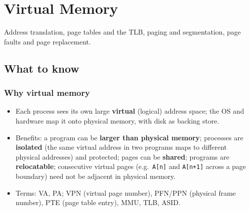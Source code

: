 \section{Virtual Memory}
\label{sec:vm}

Address translation, page tables and the TLB, paging and segmentation, page faults
and page replacement.

\subsection{What to know}

\subsubsection{Why virtual memory}
\begin{itemize}[leftmargin=*]
  \item Each process sees its own large \textbf{virtual} (logical) address space; the
  OS and hardware map it onto physical memory, with disk as backing store.
  \item Benefits: a program can be \textbf{larger than physical memory}; processes
  are \textbf{isolated} (the same virtual address in two programs maps to different
  physical addresses) and protected; pages can be \textbf{shared}; programs are
  \textbf{relocatable}; consecutive virtual pages (e.g.\ \texttt{A[n]} and
  \texttt{A[n+1]} across a page boundary) need not be adjacent in physical memory.
  \item Terms: VA, PA; VPN (virtual page number), PFN/PPN (physical frame number),
  PTE (page table entry), MMU, TLB, ASID.
\end{itemize}

